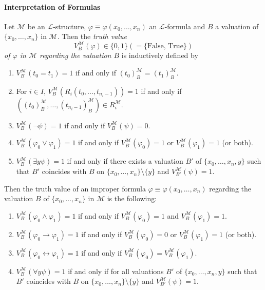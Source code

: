 \paragraph{Interpretation of Formulas} 
Let $\mathcal{M}$ be an $\mathcal{L}$-structure, $\varphi \equiv \varphi(x_0, \ldots, x_n)$ an $\mathcal{L}$-formula and $B$ a valuation of $\lbrace x_0, \ldots, x_n \rbrace$ in $\mathcal{M}$. Then the \textit{truth value} 
\[V_B^\mathcal{M}(\varphi) \in \lbrace 0,1 \rbrace (= \lbrace \text{False, True} \rbrace )\]
\textit{of $\varphi$ in $\mathcal{M}$ regarding the valuation $B$} is inductively defined by
\begin{enumerate}
\item $V_B^\mathcal{M} (t_0 = t_1) = 1$ if and only if $(t_0)^\mathcal{M}_B = (t_1)^\mathcal{M}_B$.
\item For $i \in I$, $V_B^\mathcal{M} (R_i(t_0, \ldots, t_{n_i-1})) = 1$ if and only if $((t_0)^\mathcal{M}_B, \ldots , (t_{n_i-1})^\mathcal{M}_B) \in R_i^\mathcal{M}$.
\item $V_B^\mathcal{M} (\lnot \psi) = 1$ if and only if $V_B^\mathcal{M} (\psi) = 0$.
\item $V_B^\mathcal{M} (\varphi_0 \vee \varphi_1) = 1$ if and only if $V_B^\mathcal{M} (\varphi_0) = 1$ or $V_B^\mathcal{M} (\varphi_1) = 1$ (or both).
\item $V_B^\mathcal{M} (\exists y \psi) = 1$ if and only if there exists a valuation $B'$ of $\lbrace x_0, \ldots, x_n, y \rbrace$ such that $B'$ coincides with $B$ on $\lbrace x_0, \ldots, x_n \rbrace \setminus \lbrace y \rbrace$ and $V_{B'}^\mathcal{M} (\psi) = 1$.
\end{enumerate}

Then the truth value of an improper formula $\varphi \equiv \varphi(x_0, \ldots, x_n)$ regarding the valuation $B$ of $\lbrace x_0, \ldots, x_n \rbrace$ in $\mathcal{M}$ is the following:
\begin{enumerate}
\item $V_B^\mathcal{M} (\varphi_0 \wedge \varphi_1) = 1$ if and only if $V_B^\mathcal{M} (\varphi_0) = 1$ and $V_B^\mathcal{M} (\varphi_1) = 1$.
\item $V_B^\mathcal{M} (\varphi_0 \rightarrow \varphi_1) = 1$ if and only if $V_B^\mathcal{M} (\varphi_0) = 0$ or $V_B^\mathcal{M} (\varphi_1) = 1$ (or both).
\item $V_B^\mathcal{M} (\varphi_0 \leftrightarrow \varphi_1) = 1$ if and only if $V_B^\mathcal{M} (\varphi_0) = V_B^\mathcal{M} (\varphi_1)$.
\item $V_B^\mathcal{M} (\forall y \psi) = 1$ if and only if for all valuations $B'$ of $\lbrace x_0, \ldots, x_n,y \rbrace$ such that $B'$ coincides with $B$ on $\lbrace x_0, \ldots, x_n \rbrace \setminus \lbrace y \rbrace$ and $V_{B'}^\mathcal{M} (\psi) = 1$.
\end{enumerate}


